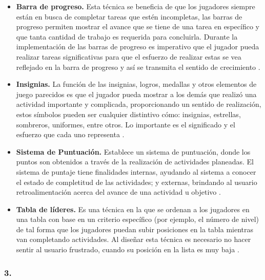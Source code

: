     \begin{itemize}
    \item
    {\bf Barra de progreso.}
        Esta técnica se beneficia de que los jugadores siempre están en busca de completar tareas
        que estén incompletas, las barras de progreso permiten mostrar el avance que se tiene de una
        tarea en específico y que tanta cantidad de trabajo es requerida para concluirla. Durante la
        implementación de las barras de progreso es imperativo que el jugador pueda realizar tareas
        significativas para que el esfuerzo de realizar estas se vea reflejado en la barra de progreso
        y así se transmita el sentido de crecimiento \cite[p. 113]{Octalysis}.

    \item
    {\bf Insignias.}
        La función de las insignias, logros, medallas y otros elementos de juego parecidos es que el
        jugador pueda mostrar a los demás que realizó una actividad importante y complicada, proporcionando
        un sentido de realización, estos símbolos pueden ser cualquier distintivo cómo: insignias,
        estrellas, sombreros, uniformes, entre otros. Lo importante es el significado y el esfuerzo
        que cada uno representa \cite[p. 117]{Octalysis}.

    \item
    {\bf Sistema de Puntuación.} %
        Establece un sistema de puntuación, donde los puntos son obtenidos a través de la realización
        de actividades planeadas. El sistema de puntaje tiene finalidades internas, ayudando al sistema
        a conocer el estado de completitud de las actividades; y externas, brindando al usuario
        retroalimentación acerca del avance de una actividad u objetivo \cite[p. 118]{Octalysis}.

    \item
    {\bf Tabla de líderes.}
        Es una técnica en la que se ordenan a los jugadores en una tabla con base en un criterio específico
        (por ejemplo, el número de nivel) de tal forma que los jugadores puedan subir posiciones en la
        tabla mientras van completando actividades. Al diseñar esta técnica es necesario no hacer
        sentir al usuario frustrado, cuando su posición en la lista es muy baja \cite[p. 121]{Octalysis}.
    \end{itemize}


\subsubsection{3. \principioIII} \label{subsec:prinpcioIII}

